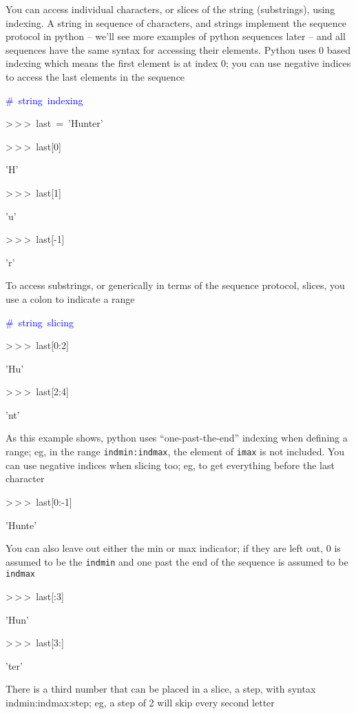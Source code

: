 You can access individual characters, or slices of the string (substrings),
using indexing. A string in sequence of characters, and strings implement
the sequence protocol in python -- we'll see more examples of python
sequences later -- and all sequences have the same syntax for accessing
their elements. Python uses 0 based indexing which means the first
element is at index 0; you can use negative indices to access the
last elements in the sequence

\begin{lyxcode}
\textcolor{blue}{\#~string~indexing}

>\,{}>\,{}>~last~=~'Hunter'

>\,{}>\,{}>~last{[}0]

'H'

>\,{}>\,{}>~last{[}1]

'u'

>\,{}>\,{}>~last{[}-1]~

'r'~
\end{lyxcode}
To access substrings, or generically in terms of the sequence protocol,
slices, you use a colon to indicate a range

\begin{lyxcode}
\textcolor{blue}{\#~string~slicing}

>\,{}>\,{}>~last{[}0:2]

'Hu'

>\,{}>\,{}>~last{[}2:4]

'nt'
\end{lyxcode}
As this example shows, python uses {}``one-past-the-end'' indexing
when defining a range; eg, in the range \texttt{indmin:indmax}, the
element of \texttt{imax} is not included. You can use negative indices
when slicing too; eg, to get everything before the last character

\begin{lyxcode}
>\,{}>\,{}>~last{[}0:-1]

'Hunte'
\end{lyxcode}
You can also leave out either the min or max indicator; if they are
left out, 0 is assumed to be the \texttt{indmin} and one past the
end of the sequence is assumed to be \texttt{indmax}

\begin{lyxcode}
>\,{}>\,{}>~last{[}:3]

'Hun'

>\,{}>\,{}>~last{[}3:]

'ter'
\end{lyxcode}
There is a third number that can be placed in a slice, a step, with
syntax indmin:indmax:step; eg, a step of 2 will skip every second
letter

